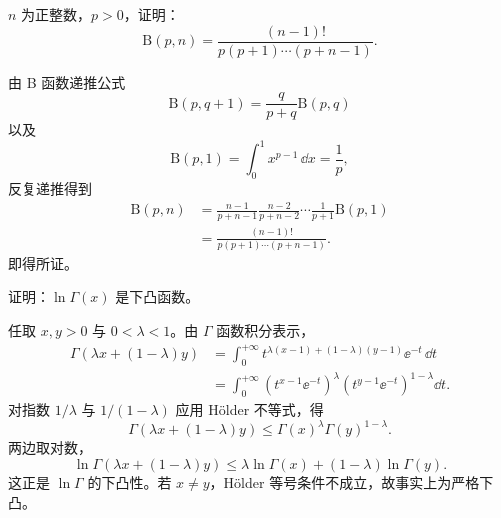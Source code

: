 \begin{xexercise}[3]
$n$ 为正整数，$p>0$，证明：
  \[
    \mathrm{B}(p,n)=\frac{(n-1)!}{p(p+1)\cdots(p+n-1)}.
  \]
\end{xexercise}
\begin{xsolution}
由 B 函数递推公式
\[
\mathrm{B}(p,q+1)=\frac q{p+q}\mathrm{B}(p,q)
\]
以及
\[
\mathrm{B}(p,1)=\int_0^1x^{p-1}\,\dd x=\frac1p,
\]
反复递推得到
\[
\begin{aligned}
\mathrm{B}(p,n)
&=\frac{n-1}{p+n-1}\frac{n-2}{p+n-2}\cdots
\frac1{p+1}\mathrm{B}(p,1)\\
&=\frac{(n-1)!}{p(p+1)\cdots(p+n-1)}.
\end{aligned}
\]
即得所证。
\end{xsolution}


\begin{xexercise}[4]
证明：$\ln\Gamma(x)$ 是下凸函数。
\end{xexercise}
\begin{xsolution}
任取 $x,y>0$ 与 $0<\lambda<1$。由 $\Gamma$ 函数积分表示，
\[
\begin{aligned}
\Gamma(\lambda x+(1-\lambda)y)
&=\int_0^{+\infty}
t^{\lambda(x-1)+(1-\lambda)(y-1)}\ee^{-t}\,\dd t\\
&=\int_0^{+\infty}
\left(t^{x-1}\ee^{-t}\right)^\lambda
\left(t^{y-1}\ee^{-t}\right)^{1-\lambda}\dd t.
\end{aligned}
\]
对指数 $1/\lambda$ 与 $1/(1-\lambda)$ 应用 Hölder 不等式，得
\[
\Gamma(\lambda x+(1-\lambda)y)
\leqslant \Gamma(x)^\lambda\Gamma(y)^{1-\lambda}.
\]
两边取对数，
\[
\ln\Gamma(\lambda x+(1-\lambda)y)
\leqslant\lambda\ln\Gamma(x)+(1-\lambda)\ln\Gamma(y).
\]
这正是 $\ln\Gamma$ 的下凸性。若 $x\neq y$，Hölder 等号条件不成立，故事实上为严格下凸。
\end{xsolution}



